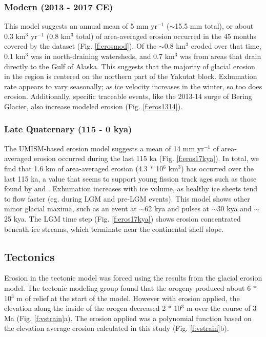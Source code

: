 \documentclass[twocolumn]{aastex6}
\begin{document}
	\subsubsection{Modern (2013 - 2017 CE)}
		This model suggests an annual mean of 5 mm yr$^{-1}$ ($\sim$15.5 mm total), or about 0.3 km$^3$ yr$^{-1}$ (0.8 km$^3$ total) of area-averaged erosion occurred in the 45 months covered by the dataset (Fig. \ref{f:erosmod}). Of the $\sim$0.8 km$^3$ eroded over that time, 0.1 km$^3$ was in north-draining watersheds, and 0.7 km$^3$ was from areas that drain directly to the Gulf of Alaska. This suggests that the majority of glacial erosion in the region is centered on the northern part of the Yakutat block. Exhumation rate appears to vary seasonally; as ice velocity increases in the winter, so too does erosion. Additionally, specific traceable events, like the 2013-14 surge of Bering Glacier, also increase modeled erosion (Fig. \ref{f:eros1314}).

	\subsubsection{Late Quaternary (115 - 0 kya)}
		The UMISM-based erosion model suggests a mean of 14 mm yr$^{-1}$ of area-averaged erosion occurred during the last 115 ka (Fig. \ref{f:eros17kya}). In total, we find that 1.6 km of area-averaged erosion (4.3 $*$ 10$^6$ km$^3$) has occurred over the last 115 ka, a value that seems to support young fission track ages such as those found by \citet{Berger2008} and \citet{Enkelmann2009}. Exhumation increases with ice volume, as healthy ice sheets tend to flow faster (eg. during LGM and pre-LGM events). This model shows other minor glacial maxima, such as an event at $\sim$62 kya and pulses at $\sim$30 kya and $\sim$25 kya. The LGM time step (Fig. \ref{f:eros17kya}) shows erosion concentrated beneath ice streams, which terminate near the continental shelf slope.

	\subsection{Tectonics}
		Erosion in the tectonic model was forced using the results from the glacial erosion model. The tectonic modeling group found that the orogeny produced about 6 $*$ 10$^3$ m of relief at the start of the model. However with erosion applied, the elevation along the inside of the orogen decreased 2 $*$ 10$^3$ m over the course of 3 Ma (Fig. \ref{f:vstrain}a). The erosion applied was a polynomial function based on the elevation average erosion calculated in this study (Fig. \ref{f:vstrain}b).
		
\end{document}
